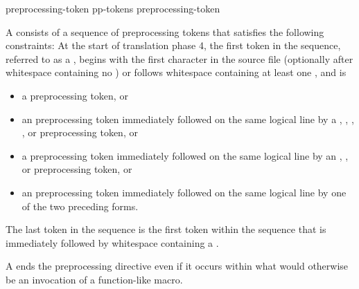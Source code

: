 \documentclass{wg21}
\begin{document}
\begin{bnf}
    \br
    preprocessing-token\br
    pp-tokens preprocessing-token
\end{bnf}

\begin{removedblock}
\begin{bnf}
    \br
\end{bnf}
\end{removedblock}

\pnum
A  consists of a sequence of preprocessing tokens
that satisfies the following constraints:
At the start of translation phase 4,
the first token in the sequence,
referred to as a ,
begins with the first character in the source file
(optionally after whitespace containing no ) or
follows whitespace containing at least one ,
and is

\begin{itemize}
    \item
    a \tcode{\#} preprocessing token, or

    \item
    an  preprocessing token
    immediately followed on the same logical line by a
    ,
    \tcode{<},
    ,
    , or
    \tcode{:}
    preprocessing token, or

    \item
    a  preprocessing token
    immediately followed on the same logical line by an
    ,
    \tcode{:}, or
    \tcode{;}
    preprocessing token, or

    \item
    an  preprocessing token
    immediately followed on the same logical line by
    one of the two preceding forms.
\end{itemize}

The last token in the sequence is the first token within the sequence that
is immediately followed by whitespace containing a .
\begin{note}
    A  ends the preprocessing directive even if it occurs
    within what would otherwise be an invocation of a function-like macro.
\end{note}
\end{document}

